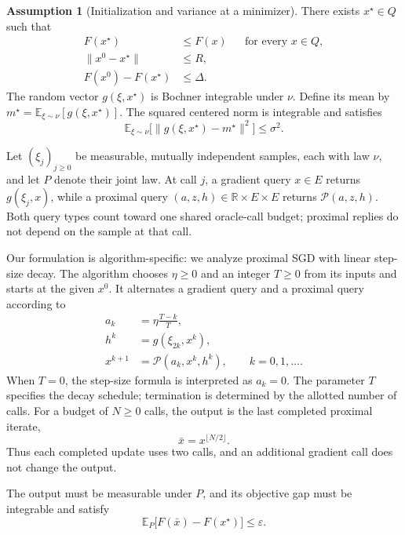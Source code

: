 \documentclass[10pt]{article}
\theoremstyle{definition}
\newtheorem{assumption}{Assumption}
\begin{document}
\begin{assumption}[Initialization and variance at a minimizer]
There exists $x^\star\in Q$ such that
\[
\begin{aligned}
F(x^\star)&\leq F(x) &&\text{for every }x\in Q,\\
\|x^0-x^\star\|&\leq R,\\
F(x^0)-F(x^\star)&\leq\Delta.
\end{aligned}
\]
The random vector $g(\xi,x^\star)$ is Bochner integrable under $\nu$. Define its mean by $m^\star=\mathbb{E}_{\xi\sim\nu}[g(\xi,x^\star)]$. The squared centered norm is integrable and satisfies
\[
\mathbb{E}_{\xi\sim\nu}
\bigl[\|g(\xi,x^\star)-m^\star\|^2\bigr]
\leq\sigma^2.
\]
\end{assumption}

Let $(\xi_j)_{j\geq0}$ be measurable, mutually independent samples, each with law $\nu$, and let $P$ denote their joint law. At call $j$, a gradient query $x\in E$ returns $g(\xi_j,x)$, while a proximal query $(a,z,h)\in\mathbb{R}\times E\times E$ returns $\mathcal{P}(a,z,h)$. Both query types count toward one shared oracle-call budget; proximal replies do not depend on the sample at that call.

Our formulation is algorithm-specific: we analyze proximal SGD with linear step-size decay. The algorithm chooses $\eta\geq0$ and an integer $T\geq0$ from its inputs and starts at the given $x^0$. It alternates a gradient query and a proximal query according to
\[
\begin{aligned}
a_k&=\eta\frac{T-k}{T},\\
h^k&=g(\xi_{2k},x^k),\\
x^{k+1}&=\mathcal{P}(a_k,x^k,h^k),
\qquad k=0,1,\ldots.
\end{aligned}
\]
When $T=0$, the step-size formula is interpreted as $a_k=0$. The parameter $T$ specifies the decay schedule; termination is determined by the allotted number of calls. For a budget of $N\geq0$ calls, the output is the last completed proximal iterate,
\[
\bar{x}=x^{\lfloor N/2\rfloor}.
\]
Thus each completed update uses two calls, and an additional gradient call does not change the output.

The output must be measurable under $P$, and its objective gap must be integrable and satisfy
\[
\mathbb{E}_{P}\bigl[F(\bar{x})-F(x^\star)\bigr]
\leq\varepsilon.
\]
\end{document}
